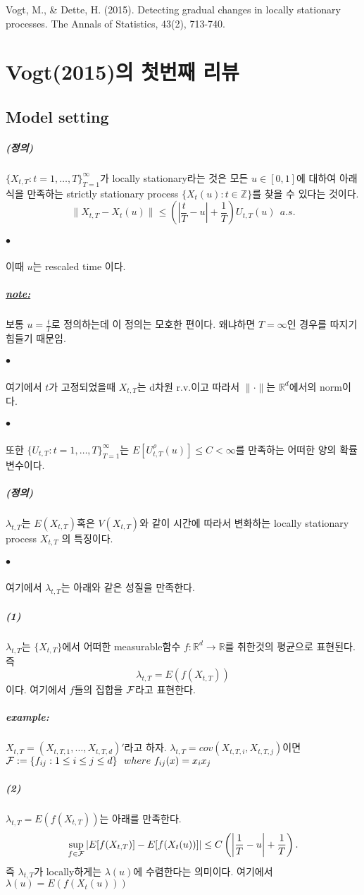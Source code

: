 \documentclass[12pt,oneside,english]{book}
\def\ck{\paragraph{\Large$\bullet$}\Large}
\def\dfn{\paragraph{\Large(정의)}\Large}
\def\note{\paragraph{\Large\textit{\underline{note:}}}\Large}
\def\ex{\paragraph{\Large\textit{example:}}\Large}
\def\one{\paragraph{\Large(1)}\Large}
\def\two{\paragraph{\Large(2)}\Large}
\begin{document}
\begin{thebibliography}{9} %
 Vogt, M., \& Dette, H. (2015). Detecting gradual changes in locally stationary processes. The Annals of Statistics, 43(2), 713-740.
\end{thebibliography}


\chapter{Vogt(2015)의 첫번째 리뷰}
\section{Model setting}
\dfn 
$\{X_{t,T}:t=1,\dots,T\}_{T=1}^{\infty}$가 locally stationary라는 것은 모든 $u \in [0,1]$에 대하여 아래식을 만족하는 strictly stationary process $\{X_t(u):t \in \mathbb{Z}\}$를 찾을 수 있다는 것이다.
\[
\|X_{t,T}-X_t(u)\|\leq \left(\left| \frac{t}{T}-u \right|+\frac{1}{T} \right)U_{t,T}(u)~~a.s.
\]

\ck 이때 $u$는 rescaled time 이다. 

\note 보통 $u=\frac{t}{T}$로 정의하는데 이 정의는 모호한 편이다. 왜냐하면 $T=\infty$인 경우를 따지기 힘들기 때문임.

\ck 여기에서 $t$가 고정되었을때 $X_{t,T}$는 d차원 r.v.이고 따라서 $\| \cdot \|$는 $\mathbb{R}^d$에서의 norm이다. 

\ck 또한 $\{U_{t,T}:t=1,\dots,T\}_{T=1}^{\infty}$는 $E[U_{t,T}^{\rho}(u)] \leq C < \infty$를 만족하는 어떠한 양의 확률변수이다. 

\dfn 
$\lambda_{t,T}$는 $E(X_{t,T})$혹은 $V(X_{t,T})$와 같이 시간에 따라서 변화하는 locally stationary process $X_{t,T}$ 의 특징이다. 

\ck 여기에서 $\lambda_{t,T}$는 아래와 같은 성질을 만족한다. 

\one $\lambda_{t,T}$는 $\{X_{t,T}\}$에서 어떠한 measurable함수 $f:\mathbb{R}^d \rightarrow \mathbb{R}$를 취한것의 평균으로 표현된다. 즉 $$\lambda_{t,T}=E(f(X_{t,T}))$$이다. 여기에서 $f$들의 집합을 $\cal F$라고 표현한다. 	

\ex $X_{t,T}=(X_{t,T,1},\dots,X_{t,T,d})'$라고 하자. $\lambda_{t,T}=cov(X_{t,T,i},X_{t,T,j})$이면 ${\cal F}:=\{f_{ij}:1\leq i \leq j \leq d\} ~~ where~f_{ij}(x)=x_ix_j$

\two $\lambda_{t,T}=E(f(X_{t,T}))$는 아래를 만족한다. $$\sup_{f\in {\cal F}} \left|E[f(X_{t,T})]-E[f(X_t(u))]\right| \leq C \left(\left| \frac{1}{T}-u \right|+\frac{1}{T} \right).$$ 즉 $\lambda_{t,T}$가 locally하게는 $\lambda(u)$에 수렴한다는 의미이다. 여기에서 $\lambda(u)=E(f(X_t(u)))$
\end{document}
